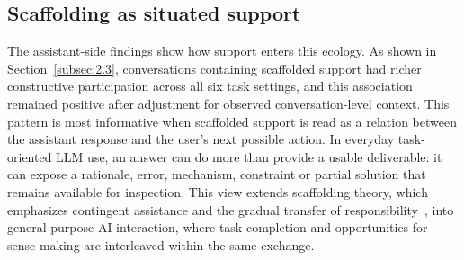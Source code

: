 

\subsection*{Scaffolding as situated support}

The assistant-side findings show how support enters this ecology. As shown in Section~\ref{subsec:2.3}, conversations containing scaffolded support had richer constructive participation across all six task settings, and this association remained positive after adjustment for observed conversation-level context. This pattern is most informative when scaffolded support is read as a relation between the assistant response and the user's next possible action. In everyday task-oriented LLM use, an answer can do more than provide a usable deliverable: it can expose a rationale, error, mechanism, constraint or partial solution that remains available for inspection. This view extends scaffolding theory, which emphasizes contingent assistance and the gradual transfer of responsibility~\cite{wood1976role,van2010scaffolding,reiser2004scaffolding}, into general-purpose AI interaction, where task completion and opportunities for sense-making are interleaved within the same exchange.


